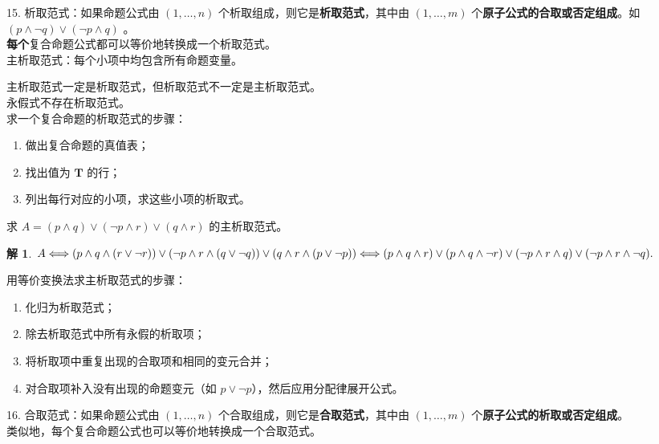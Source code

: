 \documentclass[normal,cyan]{elegantnote}
\newtheorem{solve}{解}
\begin{document}
15. 析取范式：如果命题公式由 $(1,\dots,n)$ 个析取组成，则它是\textbf{析取范式}，其中由 $(1,\dots,m)$ 个\textbf{原子公式的合取或否定组成}。如 $(p\wedge\neg q)\vee(\neg p\wedge q)$ 。
\\ \textbf{每个}复合命题公式都可以等价地转换成一个析取范式。
\\ 主析取范式：每个小项中均包含所有命题变量。
\begin{note}
    主析取范式一定是析取范式，但析取范式不一定是主析取范式。
    \\永假式不存在析取范式。
    \\求一个复合命题的析取范式的步骤：
    \begin{enumerate}[1)]
        \item 做出复合命题的真值表；
        \item 找出值为 $\mathbf{T}$ 的行；
        \item 列出每行对应的小项，求这些小项的析取式。
    \end{enumerate}
\end{note}
\begin{example}
    求 $A = \left(p \wedge q \right) \vee \left(\neg p \wedge r\right) \vee \left(q \wedge r\right)$ 的主析取范式。
\end{example}
\begin{solve}
    $A \Longleftrightarrow (p \wedge q \wedge(r \vee \neg r)) \vee (\neg p \wedge r \wedge(q \vee \neg q)) \vee (q \wedge r \wedge(p \vee \neg p))\\
        \Longleftrightarrow (p \wedge q \wedge r) \vee (p \wedge q \wedge \neg r) \vee (\neg p \wedge r \wedge q) \vee (\neg p \wedge r \wedge \neg q).
    $
\end{solve}
\begin{remark}
    用等价变换法求主析取范式的步骤：
    \begin{enumerate}[1)]
        \item 化归为析取范式；
        \item 除去析取范式中所有永假的析取项；
        \item 将析取项中重复出现的合取项和相同的变元合并；
        \item 对合取项补入没有出现的命题变元（如 $p \vee \neg p$），然后应用分配律展开公式。
    \end{enumerate}
\end{remark}
16. 合取范式：如果命题公式由 $(1,\dots,n)$ 个合取组成，则它是\textbf{合取范式}，其中由 $(1,\dots,m)$ 个\textbf{原子公式的析取或否定组成}。
\\ 类似地，每个复合命题公式也可以等价地转换成一个合取范式。
\end{document}
